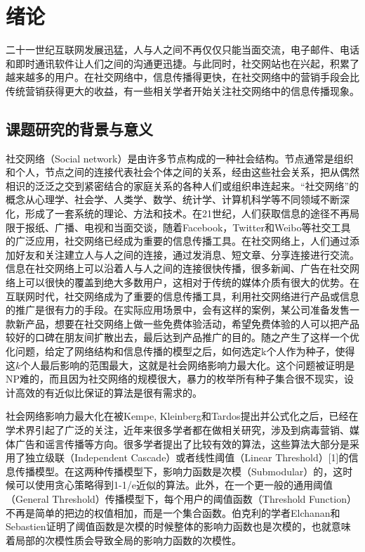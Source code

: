 
\chapter{绪论}
二十一世纪互联网发展迅猛，人与人之间不再仅仅只能当面交流，电子邮件、电话和即时通讯软件让人们之间的沟通更迅捷。与此同时，社交网站也在兴起，积累了越来越多的用户。在社交网络中，信息传播得更快，在社交网络中的营销手段会比传统营销获得更大的收益，有一些相关学者开始关注社交网络中的信息传播现象。


\section{课题研究的背景与意义}
社交网络（Social network）是由许多节点构成的一种社会结构。节点通常是组织和个人，节点之间的连接代表社会个体之间的关系，经由这些社会关系，把从偶然相识的泛泛之交到紧密结合的家庭关系的各种人们或组织串连起来。“社交网络”的概念从心理学、社会学、人类学、数学、统计学、计算机科学等不同领域不断深化，形成了一套系统的理论、方法和技术。在21世纪，人们获取信息的途径不再局限于报纸、广播、电视和当面交谈，随着Facebook，Twitter和Weibo等社交工具的广泛应用，社交网络已经成为重要的信息传播工具。在社交网络上，人们通过添加好友和关注建立人与人之间的连接，通过发消息、短文章、分享连接进行交流。信息在社交网络上可以沿着人与人之间的连接很快传播，很多新闻、广告在社交网络上可以很快的覆盖到绝大多数用户，这相对于传统的媒体介质有很大的优势。在互联网时代，社交网络成为了重要的信息传播工具，利用社交网络进行产品或信息的推广是很有力的手段。在实际应用场景中，会有这样的案例，某公司准备发售一款新产品，想要在社交网络上做一些免费体验活动，希望免费体验的人可以把产品较好的口碑在朋友间扩散出去，最后达到产品推广的目的。随之产生了这样一个优化问题，给定了网络结构和信息传播的模型之后，如何选定k个人作为种子，使得这$k$个人最后影响的范围最大，这就是社会网络影响力最大化\cite{Kempe2003maximizing}。这个问题被证明是NP难的，而且因为社交网络的规模很大，暴力的枚举所有种子集合很不现实，设计高效的有近似比保证的算法是很有需求的。

社会网络影响力最大化在被Kempe, Kleinberg和Tardos\cite{Kempe2003maximizing}提出并公式化之后，已经在学术界引起了广泛的关注，近年来很多学者都在做相关研究，涉及到病毒营销、媒体广告和谣言传播等方向。很多学者提出了比较有效的算法\cite{Kempe2003maximizing,Leskovec2007celf,Chen2009efficient,chen2010sharpphard,tang2014newrrset}，这些算法大部分是采用了独立级联（Independent Cascade）或者线性阈值（Linear Threshold）[1]的信息传播模型。在这两种传播模型下，影响力函数是次模（Submodular）的，这时候可以使用贪心策略得到1-1/e近似的算法。此外，在一个更一般的通用阈值（General Threshold）\cite{Kempe2003maximizing}传播模型下，每个用户的阈值函数（Threshold Function）不再是简单的把边的权值相加，而是一个集合函数。伯克利的学者Elchanan和Sebastien\cite{Mossel2007sub}证明了阈值函数是次模的时候整体的影响力函数也是次模的，也就意味着局部的次模性质会导致全局的影响力函数的次模性。

